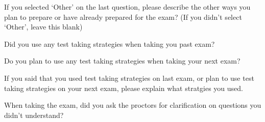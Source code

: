 \documentclass{ximera}
\begin{document}
\begin{question}
    If you selected `Other' on the last question, please describe the other ways you plan to prepare or have already prepared for the exam? (If you didn't select `Other', leave this blank)\\

    \begin{freeResponse}
    \end{freeResponse}
\end{question}




\begin{question}
    Did you use any test taking strategies when taking you past exam?

  \begin{multipleChoice}
  \end{multipleChoice}
\end{question}

\begin{question}
    Do you plan to use any test taking strategies when taking your next exam?

  \begin{multipleChoice}
  \end{multipleChoice}
\end{question}

\begin{question}
    If you said that you used test taking strategies on last exam, or plan to use test taking strategies on your next exam, please explain what stratgies you used.

    \begin{freeResponse}
    \end{freeResponse}
\end{question}

\begin{question}
   When taking the exam, did you ask the proctors for clarification on questions you didn't understand?

  \begin{multipleChoice}
  \end{multipleChoice}
\end{question}
\end{document}
